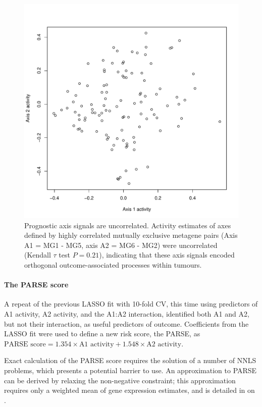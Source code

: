 \documentclass[dissertation.tex]{subfiles}
\begin{document}
\begin{figure}
\centering
\includegraphics[width=.7\linewidth]{analysis/biosurv/reports/18_SIS_diag_dsd_final/figure/metagene-pairs-10}
\caption[Prognostic axes are uncorrelated]{Prognostic axis signals are uncorrelated.  Activity estimates of axes defined by highly correlated mutually exclusive metagene pairs (Axis A1 = MG1 - MG5, axis A2 = MG6 - MG2) were uncorrelated (Kendall $\tau$ test $P = 0.21$), indicating that these axis signals encoded orthogonal outcome-associated processes within tumours.}\label{fig:sigs-axis-pairs}
\end{figure}

\paragraph{The \acrshort{PARSE} score}
A repeat of the previous \gls{LASSO} fit with 10-fold \gls{CV}, this time using predictors of A1 activity, A2 activity, and the A1:A2 interaction, identified both A1 and A2, but not their interaction, as useful predictors of outcome.  Coefficients from the \gls{LASSO} fit were used to define a new risk score, the \gls{PARSE}, as $\text{PARSE score} = 1.354 \times \text{A1 activity} + 1.548 \times \text{A2 activity}$.

Exact calculation of the \gls{PARSE} score requires the solution of a number of \gls{NNLS} problems, which presents a potential barrier to use.  An approximation to \gls{PARSE} can be derived by relaxing the non-negative constraint; this approximation requires only a weighted mean of gene expression estimates, and is detailed in  on .
\end{document}

